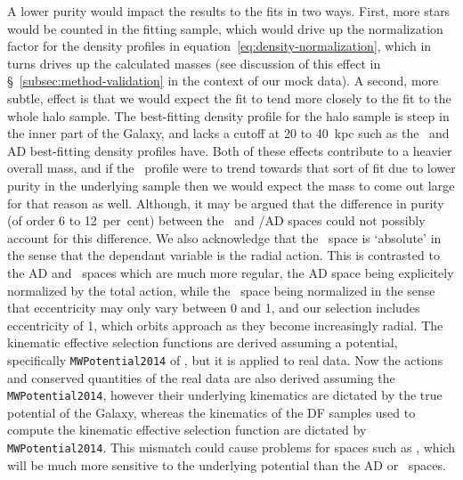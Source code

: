 A lower purity would impact the results to the fits in two ways. First, more stars would be counted in the fitting sample, which would drive up the normalization factor for the density profiles in equation~\eqref{eq:density-normalization}, which in turns drives up the calculated masses (see discussion of this effect in \S~\ref{subsec:method-validation} in the context of our mock data). A second, more subtle, effect is that we would expect the fit to tend more closely to the fit to the whole halo sample. The best-fitting density profile for the halo sample is steep in the inner part of the Galaxy, and lacks a cutoff at 20 to 40~kpc such as the \eLz\ and AD best-fitting density profiles have. Both of these effects contribute to a heavier overall mass, and if the \JRLz\ profile were to trend towards that sort of fit due to lower purity in the underlying sample then we would expect the mass to come out large for that reason as well. Although, it may be argued that the difference in purity (of order 6 to 12~per~cent) between the \JRLz\ and \eLz/AD spaces could not possibly account for this difference. We also acknowledge that the \JRLz\ space is `absolute' in the sense that the dependant variable is the radial action. This is contrasted to the AD and \eLz\ spaces which are much more regular, the AD space being explicitely normalized by the total action, while the \eLz\ space being normalized in the sense that eccentricity may only vary between 0 and 1, and our selection includes eccentricity of 1, which orbits approach as they become increasingly radial. The kinematic effective selection functions are derived assuming a potential, specifically \texttt{MWPotential2014} of \textcite{bovy15}, but it is applied to real data. Now the actions and conserved quantities of the real data are also derived assuming the \texttt{MWPotential2014}, however their underlying kinematics are dictated by the true potential of the Galaxy, whereas the kinematics of the DF samples used to compute the kinematic effective selection function are dictated by \texttt{MWPotential2014}. This mismatch could cause problems for spaces such as \JRLz, which will be much more sensitive to the underlying potential than the AD or \eLz\ spaces.


